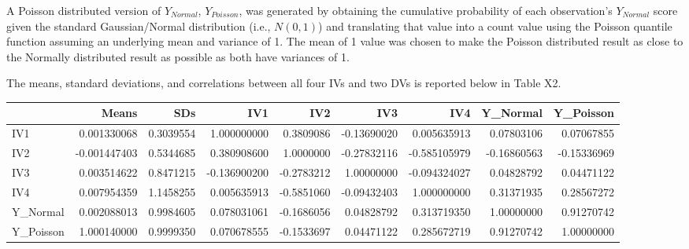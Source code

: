 \documentclass[ShortAfour,times,sageapa]{sagej}
\begin{document}
	A Poisson distributed version of $Y_{Normal}$, $Y_{Poisson}$, was generated by obtaining the cumulative probability of each observation's $Y_{Normal}$ score given the standard Gaussian/Normal distribution (i.e., $N(0,1)$) and translating that value into a count value using the Poisson quantile function assuming an underlying mean and variance of 1.  
	The mean of 1 value was chosen to make the Poisson distributed result as close to the Normally distributed result as possible as both have variances of 1.	
	
	
	The means, standard deviations, and correlations between all four IVs and two DVs is reported below in Table X2.
	
	\begin{longtable}{l|rr|rrrrrr}
		\toprule
		\multicolumn{1}{l}{} & Means & SDs & IV1 & IV2 & IV3 & IV4 & Y\_Normal & Y\_Poisson \\ 
		\midrule
		IV1 & 0.001330068 & 0.3039554 & 1.000000000 & 0.3809086 & -0.13690020 & 0.005635913 & 0.07803106 & 0.07067855 \\ 
		IV2 & -0.001447403 & 0.5344685 & 0.380908600 & 1.0000000 & -0.27832116 & -0.585105979 & -0.16860563 & -0.15336969 \\ 
		IV3 & 0.003514622 & 0.8471215 & -0.136900200 & -0.2783212 & 1.00000000 & -0.094324027 & 0.04828792 & 0.04471122 \\ 
		IV4 & 0.007954359 & 1.1458255 & 0.005635913 & -0.5851060 & -0.09432403 & 1.000000000 & 0.31371935 & 0.28567272 \\ 
		Y\_Normal & 0.002088013 & 0.9984605 & 0.078031061 & -0.1686056 & 0.04828792 & 0.313719350 & 1.00000000 & 0.91270742 \\ 
		Y\_Poisson & 1.000140000 & 0.9999350 & 0.070678555 & -0.1533697 & 0.04471122 & 0.285672719 & 0.91270742 & 1.00000000 \\ 
		\bottomrule
	\end{longtable}
\end{document}
